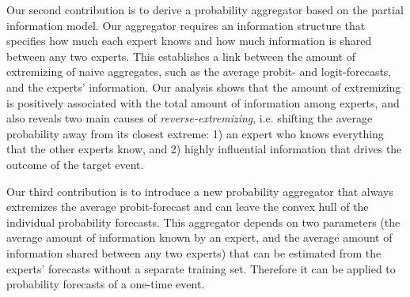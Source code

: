 \documentclass[11pt]{article}
\theoremstyle{definition}
\theoremstyle{definition}
\begin{document}
Our second contribution is to derive a probability aggregator based on the partial information model. Our aggregator requires an information structure that specifies how much each expert knows and how much information is shared between any two experts.  
This establishes a link between the amount of extremizing of naive aggregates, such as the average probit- and logit-forecasts, and the experts' information. Our analysis shows that the amount of extremizing is positively associated with the total amount of information among experts, and also reveals two main causes of \textit{reverse-extremizing}, i.e. shifting the average probability away from its closest extreme: 1) an expert who knows everything that the other experts know, and 2) highly influential information that drives the outcome of the target event. 

Our third contribution is to introduce a new probability aggregator that always extremizes the average probit-forecast and can leave the convex hull of the individual probability forecasts. This aggregator depends on two parameters (the average amount of information known by an expert, and the average amount of information shared between any two experts) that can be estimated from the experts' forecasts without a separate training set. Therefore it can be applied to probability forecasts of a one-time event. 

 
 
 





\end{document}
